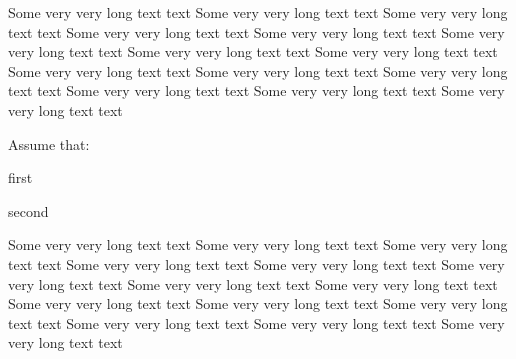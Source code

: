 Some very very long text text Some very very long text text Some very very long text text Some very very long text text Some very very long text text Some very very long text text Some very very long text text Some very very long text text Some very very long text text Some very very long text text Some very very long text text Some very very long text text Some very very long text text Some very very long text text 
\begin{tcolorbox}[title={$\boldsymbol{\Rightarrow}$},enhanced,breakable,blanker,coltitle=violet,fonttitle=\bfseries,detach title,before upper={\tikz[baseline=0pt,remember picture]\node[violet!50,line width=1pt,rounded corners,fill=white,text height={height("I")},text depth={depth("y")},draw,anchor=base] (mynode){\tcbtitle};\vspace{.2em}\hspace{.5em}},
left=5pt,
remember,
overlay unbroken={\draw[overlay] (mynode.west) -| (frame.south west);},
]
Assume that:
\begin{assumptions}
\item first
\item second
\end{assumptions}
\end{tcolorbox}
Some very very long text text Some very very long text text Some very very long text text Some very very long text text Some very very long text text Some very very long text text Some very very long text text Some very very long text text Some very very long text text Some very very long text text Some very very long text text Some very very long text text Some very very long text text Some very very long text text 